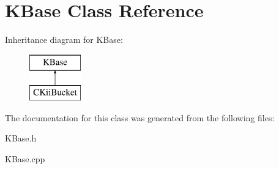 \hypertarget{class_k_base}{\section{K\-Base Class Reference}
\label{class_k_base}
}
Inheritance diagram for K\-Base\-:\begin{figure}[H]
\begin{center}
\leavevmode
\includegraphics[height=2.000000cm]{class_k_base}
\end{center}
\end{figure}


The documentation for this class was generated from the following files\-:\begin{DoxyCompactItemize}
\item 
K\-Base.\-h\item 
K\-Base.\-cpp\end{DoxyCompactItemize}
